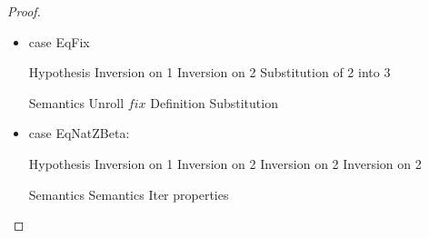 \begin{proof}
\begin{itemize}
\item case EqFix
  \begin{eqnproof}
              {Hypothesis}
              {Inversion on 1}
              {Inversion on 2}
              {Substitution of 2 into 3}
  \end{eqnproof}
  \begin{eqnproof}
          {Semantics}
          {Unroll $fix$}
          {Definition}
          {Substitution}
  \end{eqnproof}

\item case EqNatZBeta:
  \begin{eqnproof}
              {Hypothesis}
              {Inversion on 1}
    \eclaim[3]{\judgeE{\Gamma}{\z}{\N}}
              {Inversion on 2}
              {Inversion on 2}
              {Inversion on 2}
  \end{eqnproof}
  \begin{eqnproof}[\interpE{\judgeE{\Gamma}{\iter{\z}{e_0}{x}{e_1}}{A}}\;\theta\;\gamma =]
          {Semantics}
          {Semantics}
          {Iter properties}
  \end{eqnproof}


\end{itemize}
\end{proof}
